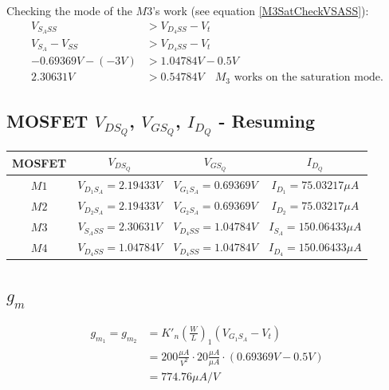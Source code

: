 Checking the mode of the $M3$'s work (see equation \ref{M3SatCheckVSASS}):
\begin{align}
V_{{S_A}SS} &> V_{{D_4}SS} - V_t\\
V_{S_A} - V_{SS} &> V_{{D_4}SS} - V_t\\
-0.69369V - (-3V) &> 1.04784V - 0.5V\\
2.30631V &> 0.54784V \quad M_3\text{ works on the saturation mode.}
\end{align}

\subsection{MOSFET $V_{DS_Q}$, $V_{GS_Q}$, $I_{D_Q}$ - Resuming}
\begin{center}
\begin{tabular}{|c|c|c|c|}
\hline
MOSFET & $V_{DS_Q}$ & $V_{GS_Q}$ & $I_{D_Q}$ \\
\hline
$M1$ & $V_{D_1S_A} = 2.19433V$ & $V_{G_1S_A} = 0.69369V$ & $I_{D_1} = 75.03217\mu A$ \\
\hline
$M2$ & $V_{D_2S_A} = 2.19433V$ & $V_{G_2S_A} = 0.69369V$ & $I_{D_2} = 75.03217\mu A$ \\
\hline
$M3$ & $V_{S_ASS} = 2.30631V$ & $V_{D_4SS} = 1.04784V$ & $I_{S_A} = 150.06433 \mu A$ \\
\hline
$M4$ & $V_{D_4SS} = 1.04784V$ & $V_{D_4SS} = 1.04784V$ & $I_{D_4} = 150.06433 \mu A$ \\
\hline
\end{tabular}
\end{center}

\subsection{$g_m$}
\begin{align}
g_{m_1} = g_{m_2} &= K'_n \left(\frac{W}{L}\right)_1 (V_{G_1S_A} - V_t)\\
&= 200 \frac{\mu A}{V^2} \cdot 20 \frac{\mu A}{\mu A} \cdot (0.69369V-0.5V)\\
&= 774.76 \mu A/V
\end{align}

